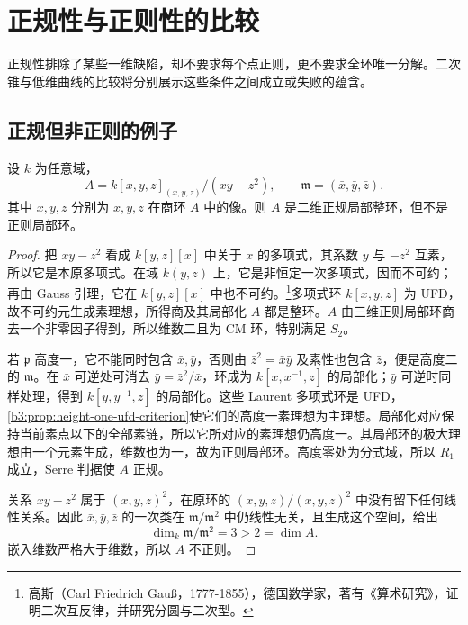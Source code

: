 
\section{正规性与正则性的比较}
\label{b3:sec:2004}

正规性排除了某些一维缺陷，却不要求每个点正则，更不要求全环唯一分解。二次锥与低维曲线的比较将分别展示这些条件之间成立或失败的蕴含。


%
%

\subsection{正规但非正则的例子}
\label{b3:subsec:2004:01}

\begin{example}\label{b3:exm:normal-quadric-cone}
	设 \(k\) 为任意域，
	\[
		A=k[x,y,z]_{(x,y,z)}/(xy-z^2),\qquad\mathfrak m=(\bar x,\bar y,\bar z).
	\]
	其中 \(\bar x,\bar y,\bar z\) 分别为 \(x,y,z\) 在商环 \(A\) 中的像。则 \(A\) 是二维正规局部整环，但不是正则局部环。
\end{example}
\begin{proof}
	把 \(xy-z^2\) 看成 \(k[y,z][x]\) 中关于 \(x\) 的多项式，其系数 \(y\) 与 \(-z^2\) 互素，所以它是本原多项式。在域 \(k(y,z)\) 上，它是非恒定一次多项式，因而不可约；再由 Gauss 引理，它在 \(k[y,z][x]\) 中也不可约。\footnote{高斯（Carl Friedrich Gauß，1777-1855），德国数学家，著有《算术研究》，证明二次互反律，并研究分圆与二次型。}多项式环 \(k[x,y,z]\) 为 UFD，故不可约元生成素理想，所得商及其局部化 \(A\) 都是整环。\(A\) 由三维正则局部环商去一个非零因子得到，所以维数二且为 CM 环，特别满足 \(S_2\)。

	若 \(\mathfrak p\) 高度一，它不能同时包含 \(\bar x,\bar y\)，否则由 \(\bar z^2=\bar x\bar y\) 及素性也包含 \(\bar z\)，便是高度二的 \(\mathfrak m\)。在 \(\bar x\) 可逆处可消去 \(\bar y=\bar z^2/\bar x\)，环成为 \(k[x,x^{-1},z]\) 的局部化；\(\bar y\) 可逆时同样处理，得到 \(k[y,y^{-1},z]\) 的局部化。这些 Laurent 多项式环是 UFD，\cref{b3:prop:height-one-ufd-criterion}使它们的高度一素理想为主理想。局部化对应保持当前素点以下的全部素链，所以它所对应的素理想仍高度一。其局部环的极大理想由一个元素生成，维数也为一，故为正则局部环。高度零处为分式域，所以 \(R_1\) 成立，Serre 判据使 \(A\) 正规。

	关系 \(xy-z^2\) 属于 \((x,y,z)^2\)，在原环的 \((x,y,z)/(x,y,z)^2\) 中没有留下任何线性关系。因此 \(\bar x,\bar y,\bar z\) 的一次类在 \(\mathfrak m/\mathfrak m^2\) 中仍线性无关，且生成这个空间，给出
	\[
		\dim_k\mathfrak m/\mathfrak m^2=3>2=\dim A.
	\]
	嵌入维数严格大于维数，所以 \(A\) 不正则。
\end{proof}

